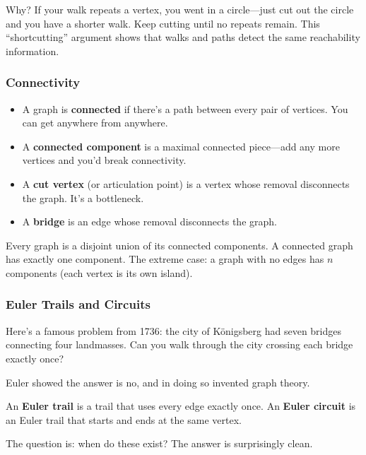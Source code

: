 Why? If your walk repeats a vertex, you went in a circle---just cut out the circle and you have a shorter walk. Keep cutting until no repeats remain. This ``shortcutting'' argument shows that walks and paths detect the same reachability information.

\subsubsection*{Connectivity}

\begin{definition}[Connectivity]
\begin{itemize}
  \item A graph is \textbf{connected} if there's a path between every pair of vertices. You can get anywhere from anywhere.
  \item A \textbf{connected component} is a maximal connected piece---add any more vertices and you'd break connectivity.
  \item A \textbf{cut vertex} (or articulation point) is a vertex whose removal disconnects the graph. It's a bottleneck.
  \item A \textbf{bridge} is an edge whose removal disconnects the graph.
\end{itemize}
\end{definition}

Every graph is a disjoint union of its connected components. A connected graph has exactly one component. The extreme case: a graph with no edges has $n$ components (each vertex is its own island).

\subsubsection*{Euler Trails and Circuits}

Here's a famous problem from 1736: the city of Königsberg had seven bridges connecting four landmasses. Can you walk through the city crossing each bridge exactly once?

Euler showed the answer is no, and in doing so invented graph theory.

\begin{definition}
An \textbf{Euler trail} is a trail that uses every edge exactly once.
An \textbf{Euler circuit} is an Euler trail that starts and ends at the same vertex.
\end{definition}

The question is: when do these exist? The answer is surprisingly clean.

